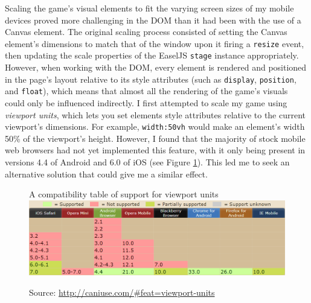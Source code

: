 \documentclass[final]{cmpreport}
\begin{document}
Scaling the game's visual elements to fit the varying screen sizes of my mobile devices proved more challenging in the DOM than it had been with the use of a Canvas element. The original scaling process consisted of setting the Canvas element's dimensions to match that of the window upon it firing a \texttt{resize} event, then updating the scale properties of the EaselJS \texttt{stage} instance appropriately. However, when working with the DOM, every element is rendered and positioned in the page's layout relative to its style attributes (such as \texttt{display}, \texttt{position}, and \texttt{float}), which means that almost all the rendering of the game's visuals could only be influenced indirectly. I first attempted to scale my game using \textit{viewport units}, which lets you set elements style attributes relative to the current viewport's dimensions. For example, \texttt{width:50vh} would make an element's width 50\% of the viewport's height. However, I found that the majority of stock mobile web browsers had not yet implemented this feature, with it only being present in versions 4.4 of Android and 6.0 of iOS (see Figure \ref{viewport}). This led me to seek an alternative solution that could give me a similar effect.

\begin{figure}[h]{A compatibility table of support for viewport units \label{viewport}}
  \includegraphics[width=1.0\textwidth]{viewportunits.png}
    \begin{tablenotes}
      \item Source: \url{http://caniuse.com/\#feat=viewport-units}
    \end{tablenotes}
\end{figure}
\end{document}
